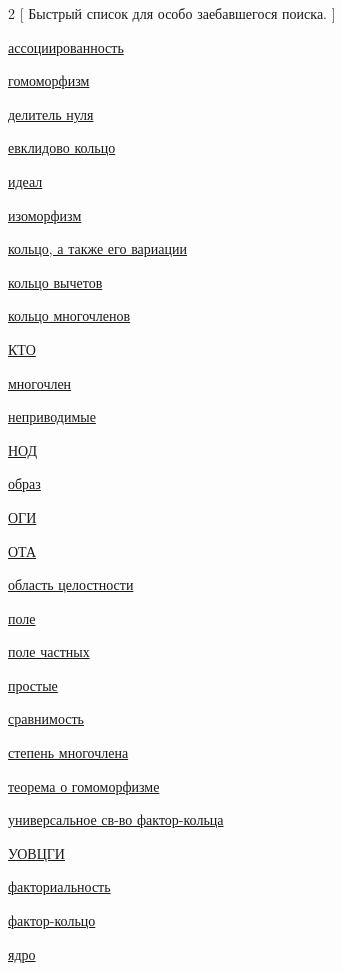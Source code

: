\documentclass[a4paper,100pt]{article}
\theoremstyle{indented}
\theoremstyle{definition}
\theoremstyle{remark}
\begin{document}
\begin{multicols}{2}
    [
    Быстрый список для особо заебавшегося поиска.
    ]

    \hyperlink{n4}{ассоциированность}\

    \hyperlink{n19}{гомоморфизм}\
    
    \hyperlink{n3}{делитель нуля}\

    \hyperlink{n5}{евклидово кольцо}\

    \hyperlink{n9}{идеал}\

    \hyperlink{22}{изоморфизм}\
    
    \hyperlink{n1}{кольцо, а также его вариации}\

    \hyperlink{n14}{кольцо вычетов}\

    \hyperlink{n28}{кольцо многочленов}\

    \hyperlink{n15}{КТО}\

    \hyperlink{n27}{многочлен}\

    \hyperlink{n7}{неприводимые}\

    \hyperlink{n6}{НОД}\

    \hyperlink{n21}{образ}\

    \hyperlink{n10}{ОГИ}\

    \hyperlink{n13}{ОТА}\

    \hyperlink{n2}{область целостности}\

    \hyperlink{n16}{поле}\

    \hyperlink{n18}{поле частных}\

    \hyperlink{n8}{простые}\ 

    \hyperlink{n23}{сравнимость}\

    \hyperlink{n29}{степень многочлена}\

    \hyperlink{n25}{теорема о гомоморфизме}\

    \hyperlink{n26}{универсальное св-во фактор-кольца}\

    \hyperlink{n11}{УОВЦГИ}\

    \hyperlink{n12}{факториальность}\

    \hyperlink{n24}{фактор-кольцо}\

    \hyperlink{n20}{ядро}\
    

\end{multicols}
\end{document}
